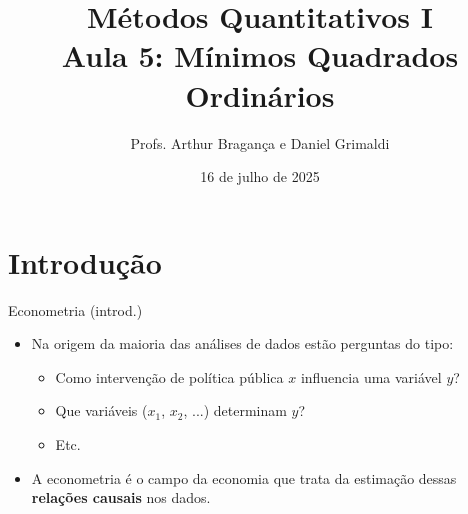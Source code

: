 \documentclass[10pt,slides,xcolor=pdftex,dvipsnames,table]{beamer}
\title{
     Métodos Quantitativos I \\\vspace{6pt}
     Aula 5: Mínimos Quadrados Ordinários \\
    }
\author{Profs. Arthur Bragança e Daniel Grimaldi}
\institute{MPAM-ENAP}
\date{16 de julho de 2025}
\begin{document}
    \begin{frame}[plain]
        \titlepage
    \end{frame}

    \begin{frame}[plain]
        \tableofcontents
    \end{frame}
    

\section{Introdução}


\begin{frame}{Econometria (introd.)}

\begin{itemize}\itemsep1.2em

    \item Na origem da maioria das análises de dados estão perguntas do tipo:
    
    \begin{itemize}
    \item Como intervenção de política pública $x$ influencia uma variável $y$? 
    \item Que variáveis ($x_1$, $x_2$, ...) determinam $y$?
    \item Etc.
	\end{itemize}        
	
	\item A econometria é o campo da economia que trata da estimação dessas \textbf{relações causais} nos dados.

\end{itemize}

\end{frame}

\end{document}
